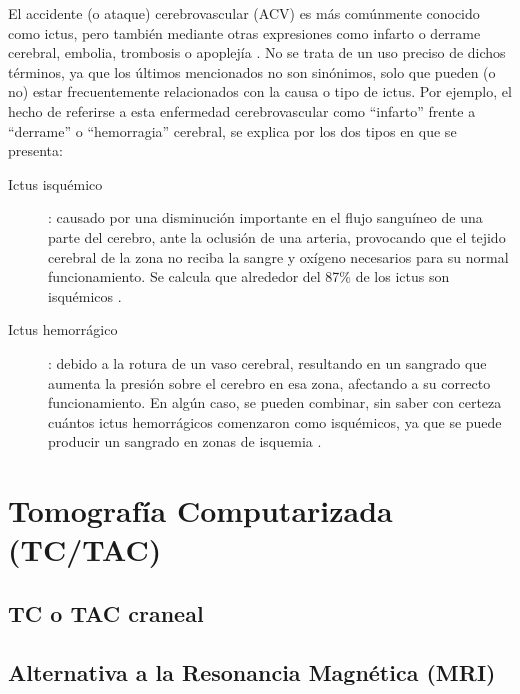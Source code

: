 El accidente (o ataque) cerebrovascular (ACV) es más comúnmente conocido como ictus, pero también mediante otras expresiones como infarto o derrame cerebral, embolia, trombosis o apoplejía \cite{wiki:acv}. No se trata de un uso preciso de dichos términos, ya que los últimos mencionados no son sinónimos, solo que pueden (o no) estar frecuentemente relacionados con la causa o tipo de ictus. Por ejemplo, el hecho de referirse a esta enfermedad cerebrovascular como ``infarto'' frente a ``derrame'' o ``hemorragia'' cerebral, se explica por los dos tipos en que se presenta:
\begin{description}
	\item [Ictus isquémico]: causado por una disminución importante en el flujo sanguíneo de una parte del cerebro, ante la oclusión de una arteria, provocando que el tejido cerebral de la zona no reciba la sangre y oxígeno necesarios para su normal funcionamiento. Se calcula que alrededor del 87\% de los ictus son isquémicos \cite{wiki:stroke}.	
	
	\item [Ictus hemorrágico]: debido a la rotura de un vaso cerebral, resultando en un sangrado que aumenta la presión sobre el cerebro en esa zona, afectando a su correcto funcionamiento. En algún caso, se pueden combinar, sin saber con certeza cuántos ictus hemorrágicos comenzaron como isquémicos, ya que se puede producir un sangrado en zonas de isquemia \cite{wiki:stroke}.
\end{description}



\section{Tomografía Computarizada (TC/TAC)}




\subsection{TC o TAC craneal}





\subsection{Alternativa a la Resonancia Magnética (MRI)}






